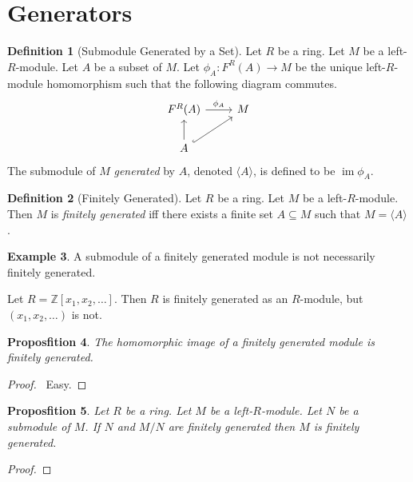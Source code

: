 \documentclass{book}
\let\qed\relax
\newtheorem{prop}{Proposfition}[chapter]
\theoremstyle{definition}
\newtheorem{df}[prop]{Definition}
\newtheorem{ex}[prop]{Example}
\newcommand{\im}{\ensuremath{\operatorname{im}}}
\begin{document}
\section{Generators}

\begin{df}[Submodule Generated by a Set]
Let $R$ be a ring. Let $M$ be a left-$R$-module. Let $A$ be a subset of $M$. Let $\phi_A : F^R(A) \rightarrow M$ be the unique left-$R$-module homomorphism such that the following diagram commutes.
\[ \begin{tikzcd}
F^R(A) \arrow[r,"\phi_A"] & M \\
A \arrow[u] \arrow[ur,hook]
\end{tikzcd} \]
The submodule of $M$ \emph{generated} by $A$, denoted $\langle A \rangle$, is defined to be $\im \phi_A$.
\end{df}

\begin{df}[Finitely Generated]
Let $R$ be a ring. Let $M$ be a left-$R$-module. Then $M$ is \emph{finitely generated} iff there exists a finite set $A \subseteq M$ such that $M = \langle A \rangle$.
\end{df}

\begin{ex}
A submodule of a finitely generated module is not necessarily finitely generated.

Let $R = \mathbb{Z}[x_1, x_2, \ldots]$. Then $R$ is finitely generated as an $R$-module, but $(x_1, x_2, \ldots)$ is not.
\end{ex}

\begin{prop}
The homomorphic image of a finitely generated module is finitely generated.
\end{prop}

\begin{proof}
\pf\ Easy.  \qed
\end{proof}

\begin{prop}
Let $R$ be a ring. Let $M$ be a left-$R$-module. Let $N$ be a submodule of $M$. If $N$ and $M/N$ are finitely generated then $M$ is finitely generated.
\end{prop}

\begin{proof}
\pf
{}
\qed
\end{proof}
\end{document}
